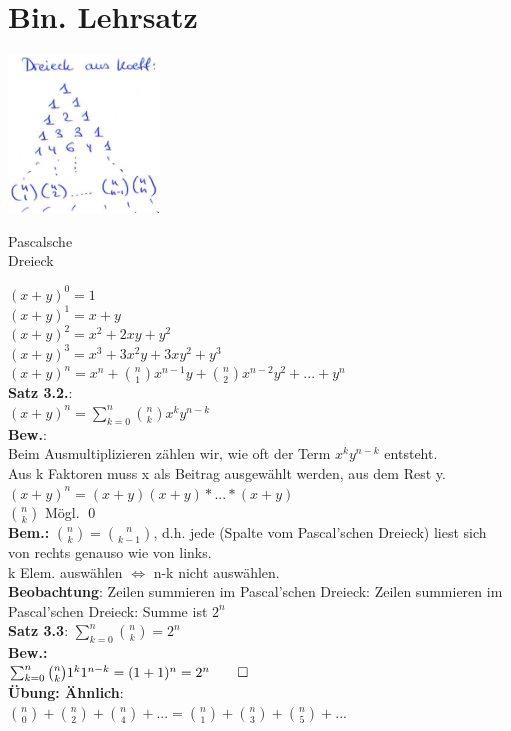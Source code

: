 \section{Bin. Lehrsatz}
\begin{floatingfigure}[r]{6cm}
	\mbox{\includegraphics[width=0.3\textwidth]{img/pascal.PNG}}
	\caption{Pascalsche\\ Dreieck}
\end{floatingfigure}
$(x+y)^0=1$\\
$(x+y)^1 = x+y$\\
$(x+y)^2 = x^2+2xy+y^2$\\
$(x+y)^3= x^3+3x^2y+3xy^2+y^3$\medskip\\
$(x+y)^n=x^n+\binom{n}{1}x^{n-1}y+\binom{n}{2}x^{n-2}y^2+...+y^n$\medskip\\ 
\textbf{Satz 3.2.}:\\
$(x+y)^n =\sum^n_{k=0} \binom{n}{k}x^ky^{n-k}$\medskip\\
\textbf{Bew.}: \\
Beim Ausmultiplizieren zählen wir, wie oft der Term $x^ky^{n-k}$ entsteht.\\
Aus k Faktoren muss x als Beitrag ausgewählt werden, aus dem Rest y.
$(x+y)^n=(x+y)(x+y)*...*(x+y)$\\
$\binom{n}{k}$ Mögl. \qed\medskip\\
\textbf{Bem.:} $\binom{n}{k}=\binom{n}{k-1}$, d.h. jede (Spalte vom Pascal'schen Dreieck) liest sich von rechts genauso wie von links.\\
k Elem. auswählen $\Leftrightarrow$ n-k nicht auswählen.\\
 \textbf{Beobachtung}: Zeilen summieren im Pascal'schen Dreieck: Zeilen summieren im Pascal'schen Dreieck: Summe ist $2^n$\medskip\\
 \textbf{Satz 3.3}: $\sum^n_{k=0} \binom{n}{k} = 2^n$\\
 \textbf{Bew.:}\\
 $\sum^n_{k=0}\binom{n}{k}1^k1^{n-k} = (1+1)^n=2^n\qed$\\
 \textbf{Übung: Ähnlich}:\\
 $\binom{n}{0}+\binom{n}{2}+\binom{n}{4}+...=\binom{n}{1}+\binom{n}{3}+\binom{n}{5}+...$\newpage
